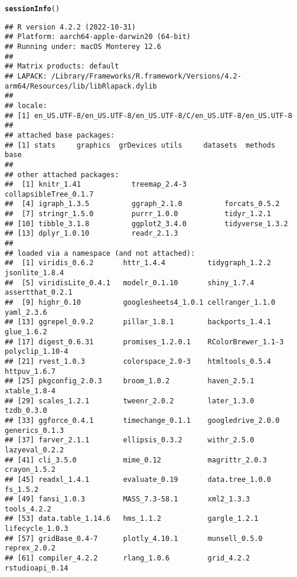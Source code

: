 \documentclass{article}\usepackage[]{graphicx}\usepackage[]{xcolor}
\makeatletter
\newcommand{\hlstd}[1]{\textcolor[rgb]{0.345,0.345,0.345}{#1}}%
\newcommand{\hlkwd}[1]{\textcolor[rgb]{0.737,0.353,0.396}{\textbf{#1}}}%
\newenvironment{kframe}{%
 \def\at@end@of@kframe{}%
 \ifinner\ifhmode%
  \def\at@end@of@kframe{\end{minipage}}%
  \begin{minipage}{\columnwidth}%
 \fi\fi%
 \def\FrameCommand##1{\hskip\@totalleftmargin \hskip-\fboxsep
 \colorbox{shadecolor}{##1}\hskip-\fboxsep
     \hskip-\linewidth \hskip-\@totalleftmargin \hskip\columnwidth}%
 \MakeFramed {\advance\hsize-\width
   \@totalleftmargin\z@ \linewidth\hsize
   \@setminipage}}%
 {\par\unskip\endMakeFramed%
 \at@end@of@kframe}
\newenvironment{knitrout}{}{} %
\makeatother
\begin{document}
\begin{knitrout}
\color{fgcolor}\begin{kframe}
\begin{alltt}
\hlkwd{sessionInfo}\hlstd{()}
\end{alltt}
\begin{verbatim}
## R version 4.2.2 (2022-10-31)
## Platform: aarch64-apple-darwin20 (64-bit)
## Running under: macOS Monterey 12.6
## 
## Matrix products: default
## LAPACK: /Library/Frameworks/R.framework/Versions/4.2-arm64/Resources/lib/libRlapack.dylib
## 
## locale:
## [1] en_US.UTF-8/en_US.UTF-8/en_US.UTF-8/C/en_US.UTF-8/en_US.UTF-8
## 
## attached base packages:
## [1] stats     graphics  grDevices utils     datasets  methods   base     
## 
## other attached packages:
##  [1] knitr_1.41            treemap_2.4-3         collapsibleTree_0.1.7
##  [4] igraph_1.3.5          ggraph_2.1.0          forcats_0.5.2        
##  [7] stringr_1.5.0         purrr_1.0.0           tidyr_1.2.1          
## [10] tibble_3.1.8          ggplot2_3.4.0         tidyverse_1.3.2      
## [13] dplyr_1.0.10          readr_2.1.3          
## 
## loaded via a namespace (and not attached):
##  [1] viridis_0.6.2       httr_1.4.4          tidygraph_1.2.2     jsonlite_1.8.4     
##  [5] viridisLite_0.4.1   modelr_0.1.10       shiny_1.7.4         assertthat_0.2.1   
##  [9] highr_0.10          googlesheets4_1.0.1 cellranger_1.1.0    yaml_2.3.6         
## [13] ggrepel_0.9.2       pillar_1.8.1        backports_1.4.1     glue_1.6.2         
## [17] digest_0.6.31       promises_1.2.0.1    RColorBrewer_1.1-3  polyclip_1.10-4    
## [21] rvest_1.0.3         colorspace_2.0-3    htmltools_0.5.4     httpuv_1.6.7       
## [25] pkgconfig_2.0.3     broom_1.0.2         haven_2.5.1         xtable_1.8-4       
## [29] scales_1.2.1        tweenr_2.0.2        later_1.3.0         tzdb_0.3.0         
## [33] ggforce_0.4.1       timechange_0.1.1    googledrive_2.0.0   generics_0.1.3     
## [37] farver_2.1.1        ellipsis_0.3.2      withr_2.5.0         lazyeval_0.2.2     
## [41] cli_3.5.0           mime_0.12           magrittr_2.0.3      crayon_1.5.2       
## [45] readxl_1.4.1        evaluate_0.19       data.tree_1.0.0     fs_1.5.2           
## [49] fansi_1.0.3         MASS_7.3-58.1       xml2_1.3.3          tools_4.2.2        
## [53] data.table_1.14.6   hms_1.1.2           gargle_1.2.1        lifecycle_1.0.3    
## [57] gridBase_0.4-7      plotly_4.10.1       munsell_0.5.0       reprex_2.0.2       
## [61] compiler_4.2.2      rlang_1.0.6         grid_4.2.2          rstudioapi_0.14    

\end{verbatim}
\end{kframe}
\end{knitrout}
\end{document}
